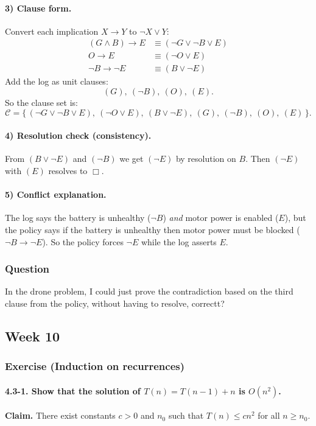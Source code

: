 \documentclass{article}
\theoremstyle{theorem}
\theoremstyle{definition}
\theoremstyle{remark}
\begin{document}
\paragraph{3) Clause form.}
Convert each implication $X\to Y$ to $\neg X \lor Y$:
\begin{align*}
(G\land B)\to E &\equiv (\neg G \lor \neg B \lor E)\\
O\to E &\equiv (\neg O \lor E)\\
\neg B \to \neg E &\equiv (B \lor \neg E)
\end{align*}
Add the log as unit clauses:
\[
(G),\ (\neg B),\ (O),\ (E).
\]
So the clause set is:
\[
\mathcal{C}=\{\,(\neg G \lor \neg B \lor E),\ (\neg O \lor E),\ (B \lor \neg E),\ (G),\ (\neg B),\ (O),\ (E)\,\}.
\]

\paragraph{4) Resolution check (consistency).}
From $(B \lor \neg E)$ and $(\neg B)$ we get $(\neg E)$ by resolution on $B$.
Then $(\neg E)$ with $(E)$ resolves to $\Box$.

\paragraph{5) Conflict explanation.}
The log says the battery is unhealthy ($\neg B$) \emph{and} motor power is enabled ($E$), but the policy says if the battery is unhealthy then motor power must be blocked ($\neg B \to \neg E$). So the policy forces $\neg E$ while the log asserts $E$.

\subsubsection*{Question}
In the drone problem, I could just prove the contradiction based on the third clause from the policy, without having to resolve, correctt? 

\subsection{Week 10}\label{sec:week10}

\subsubsection*{Exercise (Induction on recurrences)}

\paragraph{4.3-1. Show that the solution of $T(n)=T(n-1)+n$ is $O(n^2)$.}
\textbf{Claim.} There exist constants $c>0$ and $n_0$ such that $T(n)\le c n^2$ for all $n\ge n_0$.
\end{document}
